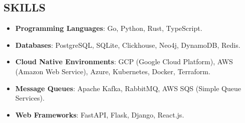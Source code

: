 \subsection*{SKILLS}

\begin{itemize}[leftmargin=*,labelsep=1mm]
  \setlength{\parskip}{0mm}
  \setlength{\itemsep}{1mm}
  \item \textbf{Programming Languages}: Go, Python, Rust, TypeScript.
  \item \textbf{Databases}: PostgreSQL, SQLite, Clickhouse, Neo4j, DynamoDB, Redis.
  \item \textbf{Cloud Native Environments}: GCP (Google Cloud Platform), AWS (Amazon Web Service), Azure,
    Kubernetes, Docker, Terraform.
  \item \textbf{Message Queues}: Apache Kafka, RabbitMQ, AWS SQS (Simple Queue Services).
  \item \textbf{Web Frameworks}: FastAPI, Flask, Django, React.js.
\end{itemize}
